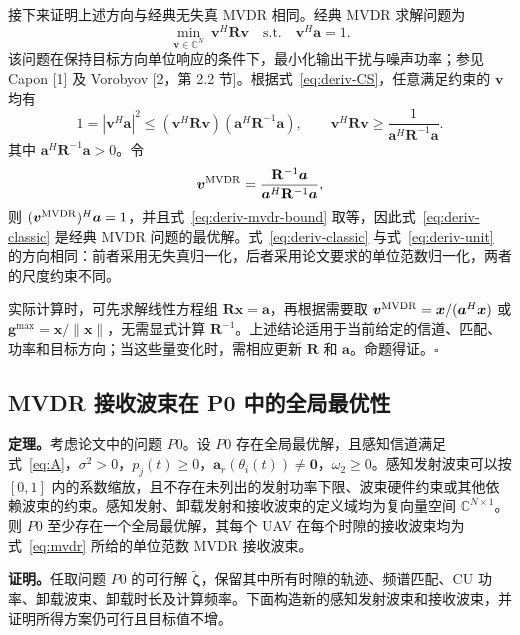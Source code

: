 \documentclass[11pt,a4paper]{ctexart}
\begin{document}
接下来证明上述方向与经典无失真 MVDR 相同。经典 MVDR 求解问题为
\begin{equation}\label{eq:deriv-mvdr-problem}
\min_{\bm v\in\mathbb C^N}\ \bm v^H\mathbf R\bm v
\quad\text{s.t.}\quad \bm v^H\bm a=1.
\end{equation}
该问题在保持目标方向单位响应的条件下，最小化输出干扰与噪声功率；参见 Capon [1] 及 Vorobyov [2，第 2.2 节]。根据式~\eqref{eq:deriv-CS}，任意满足约束的 $\bm v$ 均有
\begin{equation}\label{eq:deriv-mvdr-bound}
1=|\bm v^H\bm a|^2
\le (\bm v^H\mathbf R\bm v)(\bm a^H\mathbf R^{-1}\bm a),
\qquad
\bm v^H\mathbf R\bm v\ge
\frac{1}{\bm a^H\mathbf R^{-1}\bm a}.
\end{equation}
其中 $\bm a^H\mathbf R^{-1}\bm a>0$。令
\begin{equation}\label{eq:deriv-classic}
\bm v^{\rm MVDR}=
\frac{\mathbf R^{-1}\bm a}{\bm a^H\mathbf R^{-1}\bm a},
\end{equation}
则 $(\bm v^{\rm MVDR})^H\bm a=1$，并且式~\eqref{eq:deriv-mvdr-bound} 取等，因此式~\eqref{eq:deriv-classic} 是经典 MVDR 问题的最优解。式~\eqref{eq:deriv-classic} 与式~\eqref{eq:deriv-unit} 的方向相同：前者采用无失真归一化，后者采用论文要求的单位范数归一化，两者的尺度约束不同。

实际计算时，可先求解线性方程组 $\mathbf R\bm x=\bm a$，再根据需要取 $\bm v^{\rm MVDR}=\bm x/(\bm a^H\bm x)$ 或 $\bm g^{\max}=\bm x/\|\bm x\|$，无需显式计算 $\mathbf R^{-1}$。上述结论适用于当前给定的信道、匹配、功率和目标方向；当这些量变化时，需相应更新 $\mathbf R$ 和 $\bm a$。命题得证。\hfill$\square$


\subsection{MVDR 接收波束在 P0 中的全局最优性}


\noindent\textbf{定理。}考虑论文中的问题 $P0$。设 $P0$ 存在全局最优解，且感知信道满足式~\eqref{eq:A}，$\sigma^2>0$，$p_j(t)\ge 0$，$\bm a_r(\theta_i(t))\ne\bm 0$，$\omega_2\ge 0$。感知发射波束可以按 $[0,1]$ 内的系数缩放，且不存在未列出的发射功率下限、波束硬件约束或其他依赖波束的约束。感知发射、卸载发射和接收波束的定义域均为复向量空间 $\mathbb C^{N\times1}$。
则 $P0$ 至少存在一个全局最优解，其每个 UAV 在每个时隙的接收波束均为式~\eqref{eq:mvdr} 所给的单位范数 MVDR 接收波束。

\medskip
\noindent\textbf{证明。}任取问题 $P0$ 的可行解 $\tilde{\bm\zeta}$，保留其中所有时隙的轨迹、频谱匹配、CU 功率、卸载波束、卸载时长及计算频率。下面构造新的感知发射波束和接收波束，并证明所得方案仍可行且目标值不增。
\end{document}
